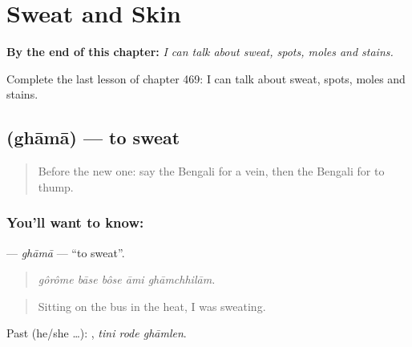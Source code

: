 
\chapter{Sweat and Skin}
\label{ch:bn-sweat-and-skin}

\begin{chapteropening}
\textbf{By the end of this chapter:} \emph{I can talk about sweat, spots, moles and stains.}

Complete the last lesson of chapter 469: I can talk about sweat, spots, moles and stains.
\end{chapteropening}

\section[\texorpdfstring{\bn{ঘামা} (ghāmā)}{ঘামা (ghāmā)}]{ (ghāmā) — to sweat}

\label{lesson:BN-C469-ghama}



\begin{quote}
Before the new one: say the Bengali for a vein, then the Bengali for to thump.
\end{quote}

\subsection*{You'll want to know: }
\textbf{} — \emph{ghāmā} — \textquotedblleft{}to sweat\textquotedblright{}.

\begin{quote}
    
\end{quote}

\begin{quote}
\emph{gôrôme bāse bôse āmi ghāmchhilām.}
\end{quote}

\begin{quote}
Sitting on the bus in the heat, I was sweating.
\end{quote}

Past (he/she …):   , \emph{tini rode ghāmlen}.

